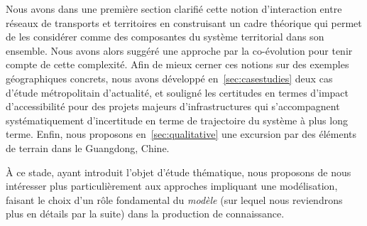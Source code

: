 Nous avons dans une première section clarifié cette notion d'interaction entre réseaux de transports et territoires en construisant un cadre théorique qui permet de les considérer comme des composantes du système territorial dans son ensemble. Nous avons alors suggéré une approche par la co-évolution pour tenir compte de cette complexité. Afin de mieux cerner ces notions sur des exemples géographiques concrets, nous avons développé en~\ref{sec:casestudies} deux cas d'étude métropolitain d'actualité, et souligné les certitudes en termes d'impact d'accessibilité pour des projets majeurs d'infrastructures qui s'accompagnent systématiquement d'incertitude en terme de trajectoire du système à plus long terme. Enfin, nous proposons en~\ref{sec:qualitative} une excursion par des éléments de terrain dans le Guangdong, Chine.

À ce stade, ayant introduit l'objet d'étude thématique, nous proposons de nous intéresser plus particulièrement aux approches impliquant une modélisation, faisant le choix d'un rôle fondamental du \emph{modèle} (sur lequel nous reviendrons plus en détails par la suite) dans la production de connaissance.



\stars





